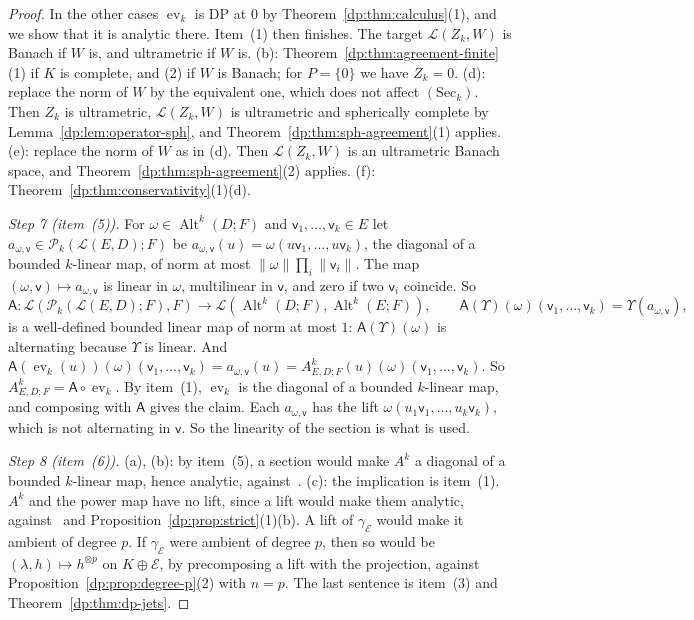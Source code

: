\documentclass[11pt]{amsart}
\theoremstyle{definition}
\theoremstyle{remark}
\numberwithin{equation}{section}
\newcommand{\cL}{\mathcal L}
\newcommand{\Alt}{\operatorname{Alt}}
\newcommand{\norm}[1]{\lVert #1\rVert}
\theoremstyle{plain}
\theoremstyle{definition}
\theoremstyle{plain}
\newcommand{\ev}{\operatorname{ev}}
\newcommand{\cP}{\mathcal P}
\begin{document}
\begin{proof}
In the other cases $\ev_k$ is DP at $0$ by Theorem~\ref{dp:thm:calculus}(1), and we show that it is analytic there. Item~(1) then finishes. The target $\cL(Z_k,W)$ is Banach if $W$ is, and ultrametric if $W$ is. (b): Theorem~\ref{dp:thm:agreement-finite}(1) if $K$ is complete, and (2) if $W$ is Banach; for $P=\{0\}$ we have $Z_k=0$. (d): replace the norm of $W$ by the equivalent one, which does not affect $(\mathrm{Sec}_k)$. Then $Z_k$ is ultrametric, $\cL(Z_k,W)$ is ultrametric and spherically complete by Lemma~\ref{dp:lem:operator-sph}, and Theorem~\ref{dp:thm:sph-agreement}(1) applies. (e): replace the norm of $W$ as in (d). Then $\cL(Z_k,W)$ is an ultrametric Banach space, and Theorem~\ref{dp:thm:sph-agreement}(2) applies. (f): Theorem~\ref{dp:thm:conservativity}(1)(d).

\emph{Step 7 (item~(5)).} For $\omega\in\Alt^k(D;F)$ and $\mathsf v_1,\dots,\mathsf v_k\in E$ let $a_{\omega,\mathsf v}\in\cP_k(\cL(E,D);F)$ be $a_{\omega,\mathsf v}(u)=\omega(u\mathsf v_1,\dots,u\mathsf v_k)$, the diagonal of a bounded $k$-linear map, of norm at most $\norm\omega\prod_i\norm{\mathsf v_i}$. The map $(\omega,\mathsf v)\mapsto a_{\omega,\mathsf v}$ is linear in $\omega$, multilinear in $\mathsf v$, and zero if two $\mathsf v_i$ coincide. So
\[
 \mathsf A\colon\cL(\cP_k(\cL(E,D);F),F)\to\cL(\Alt^k(D;F),\Alt^k(E;F)),\qquad\mathsf A(\Upsilon)(\omega)(\mathsf v_1,\dots,\mathsf v_k)=\Upsilon(a_{\omega,\mathsf v}),
\]
is a well-defined bounded linear map of norm at most $1$: $\mathsf A(\Upsilon)(\omega)$ is alternating because $\Upsilon$ is linear. And $\mathsf A(\ev_k(u))(\omega)(\mathsf v_1,\dots,\mathsf v_k)=a_{\omega,\mathsf v}(u)=A^k_{E,D;F}(u)(\omega)(\mathsf v_1,\dots,\mathsf v_k)$. So $A^k_{E,D;F}=\mathsf A\circ\ev_k$. By item~(1), $\ev_k$ is the diagonal of a bounded $k$-linear map, and composing with $\mathsf A$ gives the claim. Each $a_{\omega,\mathsf v}$ has the lift $\omega(u_1\mathsf v_1,\dots,u_k\mathsf v_k)$, which is not alternating in $\mathsf v$. So the linearity of the section is what is used.

\emph{Step 8 (item~(6)).} (a), (b): by item~(5), a section would make $A^k$ a diagonal of a bounded $k$-linear map, hence analytic, against~\cite[Theorem~7.2]{I}. (c): the implication is item~(1). $A^k$ and the power map have no lift, since a lift would make them analytic, against~\cite[Theorem~7.2]{I} and Proposition~\ref{dp:prop:strict}(1)(b). A lift of $\gamma_{\mathcal E}$ would make it ambient of degree $p$. If $\gamma_{\mathcal E}$ were ambient of degree $p$, then so would be $(\lambda,h)\mapsto h^{\otimes p}$ on $K\oplus\mathcal E$, by precomposing a lift with the projection, against Proposition~\ref{dp:prop:degree-p}(2) with $n=p$. The last sentence is item~(3) and Theorem~\ref{dp:thm:dp-jets}.
\end{proof}
\end{document}
